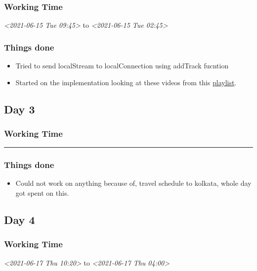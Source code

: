 \documentclass[11pt]{article}
\begin{document}
\subsubsection*{Working Time}
\label{sec:org468ba08}
\textit{<2021-06-15 Tue 09:45> } to \textit{<2021-06-15 Tue 02:45>}

\subsubsection*{Things done}
\label{sec:org3274b15}
\begin{itemize}
\item Tried to send localStream to localConnection using addTrack fucntion
\item Started on the implementation looking at these videos from this \href{https://www.youtube.com/playlist?list=PLsOU6EOcj51fvJK7Z5sb5qM57NU8vYhTy}{playlist}.
\end{itemize}

\subsection*{Day 3}
\label{sec:orgc805da6}

\subsubsection*{Working Time}
\label{sec:org7868d0e}
\noindent\rule{\textwidth}{0.5pt}

\subsubsection*{Things done}
\label{sec:orgec31d0b}
\begin{itemize}
\item Could not work on anything because of, travel schedule to kolkata, whole day got
spent on this.
\end{itemize}

\subsection*{Day 4}
\label{sec:org6ff3107}

\subsubsection*{Working Time}
\label{sec:org2afa51b}
\textit{<2021-06-17 Thu 10:20> } to \textit{<2021-06-17 Thu 04:00>}
\end{document}

